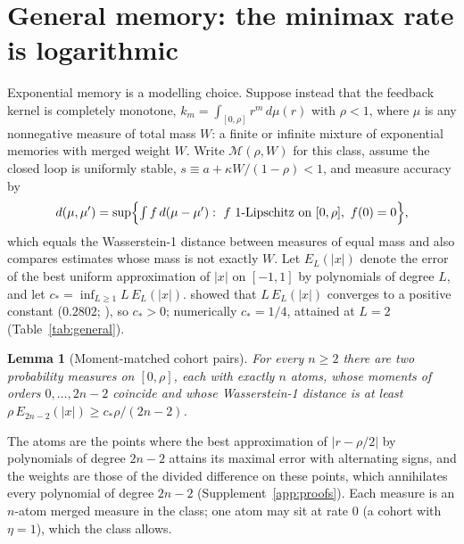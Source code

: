 \documentclass[12pt]{article}
\newtheorem{lemma}[theorem]{Lemma}
\theoremstyle{definition}
\theoremstyle{remark}
\begin{document}
\section{General memory: the minimax rate is logarithmic}\label{sec:general}

Exponential memory is a modelling choice. Suppose instead that the feedback kernel is completely monotone, $k_m=\int_{[0,\rho]}r^m\,d\mu(r)$ with $\rho<1$, where $\mu$ is any nonnegative measure of total mass $W$: a finite or infinite mixture of exponential memories with merged weight $W$. Write $\mathcal M(\rho,W)$ for this class, assume the closed loop is uniformly stable, $s\equiv a+\kappa W/(1-\rho)<1$, and measure accuracy by
\[
d(\mu,\mu')=\sup\Bigl\{\textstyle\int f\,d(\mu-\mu'):\ f\ \text{1-Lipschitz on }[0,\rho],\ f(0)=0\Bigr\},
\]
which equals the Wasserstein-1 distance between measures of equal mass and also compares estimates whose mass is not exactly $W$. Let $E_L(|x|)$ denote the error of the best uniform approximation of $|x|$ on $[-1,1]$ by polynomials of degree $L$, and let $c_*=\inf_{L\ge1}L\,E_L(|x|)$. \citet{bernstein1914} showed that $L\,E_L(|x|)$ converges to a positive constant ($0.2802$; \citealp{varga1985}), so $c_*>0$; numerically $c_*=1/4$, attained at $L=2$ (Table~\ref{tab:general}).

\begin{lemma}[Moment-matched cohort pairs]\label{lem:altpair}
For every $n\ge2$ there are two probability measures on $[0,\rho]$, each with exactly $n$ atoms, whose moments of orders $0,\ldots,2n-2$ coincide and whose Wasserstein-1 distance is at least $\rho\,E_{2n-2}(|x|)\ge c_*\rho/(2n-2)$.
\end{lemma}

The atoms are the points where the best approximation of $|r-\rho/2|$ by polynomials of degree $2n-2$ attains its maximal error with alternating signs, and the weights are those of the divided difference on these points, which annihilates every polynomial of degree $2n-2$ (Supplement~\ref{app:proofs}). Each measure is an $n$-atom merged measure in the class; one atom may sit at rate $0$ (a cohort with $\eta=1$), which the class allows.
\end{document}
